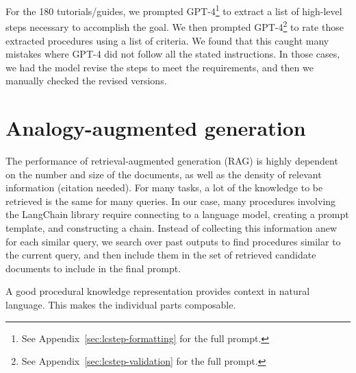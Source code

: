 \documentclass{article}
\begin{document}
For the 180 tutorials/guides, we prompted GPT-4\footnote{See Appendix~\ref{sec:lcstep-formatting} for the full prompt.} to extract a list of high-level steps necessary to accomplish the goal. We then prompted GPT-4\footnote{See Appendix~\ref{sec:lcstep-validation} for the full prompt.} to rate those extracted procedures using a list of criteria. We found that this caught many mistakes where GPT-4 did not follow all the stated instructions. In those cases, we had the model revise the steps to meet the requirements, and then we manually checked the revised versions.

\section{Analogy-augmented generation}

The performance of retrieval-augmented generation (RAG) is highly dependent on the number and size of the documents, as well as the density of relevant information (citation needed). For many tasks, a lot of the knowledge to be retrieved is the same for many queries. In our case, many procedures involving the LangChain library require connecting to a language model, creating a prompt template, and constructing a chain. Instead of collecting this information anew for each similar query, we search over past outputs to find procedures similar to the current query, and then include them in the set of retrieved candidate documents to include in the final prompt.

A good procedural knowledge representation provides context in natural language. This makes the individual parts composable.
\end{document}
